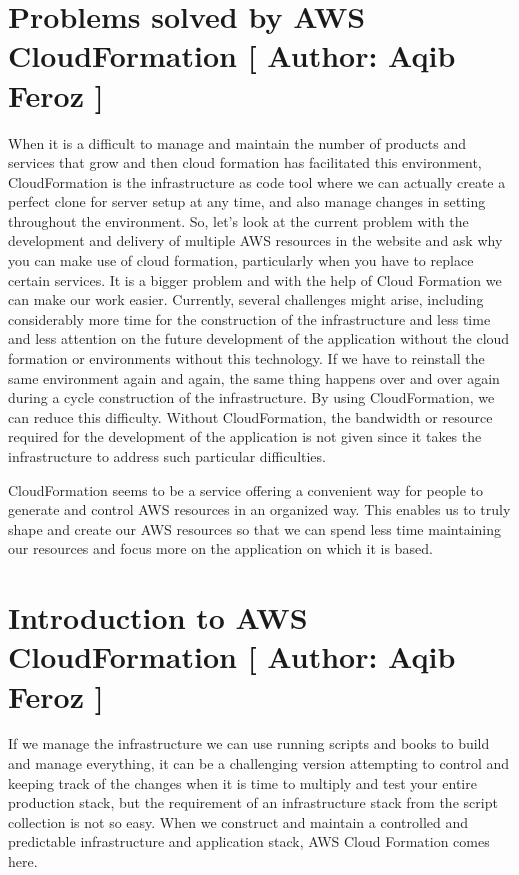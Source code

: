 \section{Problems solved by AWS CloudFormation [ Author: Aqib Feroz ]}
When it is a difficult to manage and maintain the number of products and services that grow and then cloud formation has facilitated this environment, CloudFormation is the infrastructure as code tool where we can actually create a perfect clone for server setup at any time, and also manage changes in setting throughout the environment. So, let's look at the current problem with the development and delivery of multiple AWS resources in the website and ask why you can make use of cloud formation, particularly when you have to replace certain services. It is a bigger problem and with the help of Cloud Formation we can make our work easier. Currently, several challenges might arise, including considerably more time for the construction of the infrastructure and less time and less attention on the future development of the application without the cloud formation or environments without this technology. If we have to reinstall the same environment again and again, the same thing happens over and over again during a cycle construction of the infrastructure. By using CloudFormation, we can reduce this difficulty. Without CloudFormation, the bandwidth or resource required for the development of the application is not given since it takes the infrastructure to address such particular difficulties.

CloudFormation seems to be a service offering a convenient way for people to generate and control AWS resources in an organized way. This enables us to truly shape and create our AWS resources so that we can spend less time maintaining our resources and focus more on the application on which it is based.


\section{Introduction to AWS CloudFormation [ Author: Aqib Feroz ]}

If we manage the infrastructure we can use running scripts and books to build and manage everything, it can be a challenging version attempting to control and keeping track of the changes when it is time to multiply and test your entire production stack, but the requirement of an infrastructure stack from the script collection is not so easy. When we construct and maintain a controlled and predictable infrastructure and application stack, AWS Cloud Formation comes here.

